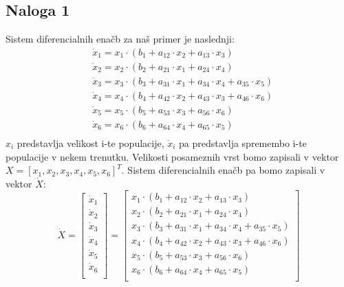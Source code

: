 \documentclass[a4paper, 12pt]{article}
\begin{document}
\subsection{Naloga 1}
Sistem diferencialnih enačb za naš primer je naslednji:
\begin{align*}
	&\dot x_{1} = x_{1}\cdot(b_{1}+a_{12}\cdot x_{2}+a_{13}\cdot x_{3}) \\
	&\dot x_{2} = x_{2}\cdot(b_{2}+a_{21}\cdot x_{1}+a_{24}\cdot x_{4}) \\
	&\dot x_{3} = x_{3}\cdot(b_{3}+a_{31}\cdot x_{1}+a_{34}\cdot x_{4}+a_{35}\cdot x_{5}) \\
	&\dot x_{4} = x_{4}\cdot(b_{4}+a_{42}\cdot x_{2}+a_{43}\cdot x_{3}+a_{46}\cdot x_{6}) \\
	&\dot x_{5} = x_{5}\cdot(b_{5}+a_{53}\cdot x_{3}+a_{56}\cdot x_{6}) \\
	&\dot x_{6} = x_{6}\cdot(b_{6}+a_{64}\cdot x_{4}+a_{65}\cdot x_{5}) \\
\end{align*}
$ x_{i} $ predstavlja velikost i-te populacije, $ \dot x_{i} $ pa predstavlja spremembo
i-te populacije v nekem trenutku. Velikosti posameznih vrst bomo zapisali v
vektor $ X = \left[x_{1}, x_{2}, x_{3}, x_{4}, x_{5}, x_{6}\right]^{T} $.
Sistem diferencialnih enačb pa bomo zapisali v vektor $ \dot X $:
\begin{equation}
	\dot X =
	\begin{bmatrix}
		\dot x_{1} \\
		\dot x_{2} \\
		\dot x_{3} \\
		\dot x_{4} \\
		\dot x_{5} \\
		\dot x_{6} \\
	\end{bmatrix}
	=
	\begin{bmatrix}
		x_{1}\cdot(b_{1}+a_{12}\cdot x_{2}+a_{13}\cdot x_{3}) \\
		x_{2}\cdot(b_{2}+a_{21}\cdot x_{1}+a_{24}\cdot x_{4}) \\
		x_{3}\cdot(b_{3}+a_{31}\cdot x_{1}+a_{34}\cdot x_{4}+a_{35}\cdot x_{5}) \\
		x_{4}\cdot(b_{4}+a_{42}\cdot x_{2}+a_{43}\cdot x_{3}+a_{46}\cdot x_{6}) \\
		x_{5}\cdot(b_{5}+a_{53}\cdot x_{3}+a_{56}\cdot x_{6}) \\
		x_{6}\cdot(b_{6}+a_{64}\cdot x_{4}+a_{65}\cdot x_{5}) \\
	\end{bmatrix}
\end{equation}
\end{document}

